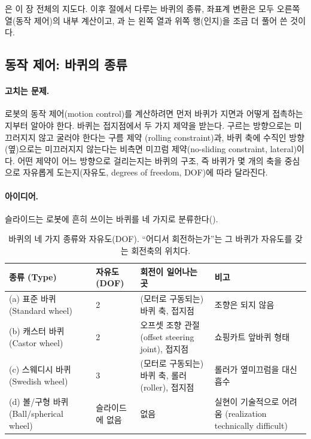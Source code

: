 은 이 장 전체의 지도다. 이후 절에서 다루는
바퀴의 종류, 좌표계 변환은 모두 오른쪽 열(동작 제어)의 내부 계산이고,
과 는 왼쪽 열과 위쪽
행(인지)을 조금 더 풀어 쓴 것이다.

\subsection{동작 제어: 바퀴의 종류}
\label{sec:lec01-wheels}

\paragraph{고치는 문제.} 로봇의 동작 제어(motion control)를 계산하려면 먼저
바퀴가 지면과 어떻게 접촉하는지부터 알아야 한다. 바퀴는 접지점에서 두 가지
제약을 받는다. 구르는 방향으로는 미끄러지지 않고 굴러야 한다는 구름 제약
(rolling constraint)과, 바퀴 축에 수직인 방향(옆)으로는 미끄러지지 않는다는
비측면 미끄럼 제약(no-sliding constraint, lateral)이다.
어떤 제약이 어느 방향으로 걸리는지는 바퀴의 구조, 즉 바퀴가 몇 개의 축을
중심으로 자유롭게 도는지(자유도, degrees of freedom, DOF)에 따라 달라진다.

\paragraph{아이디어.} 슬라이드는 로봇에 흔히 쓰이는 바퀴를 네 가지로
분류한다(). %

\begin{table}[ht]
\centering
\caption{바퀴의 네 가지 종류와 자유도(DOF). ``어디서 회전하는가''는 그 바퀴가
         자유도를 갖는 회전축의 위치다.}
\begin{tabularx}{\linewidth}{@{}l l L L@{}}
\toprule
종류 (Type) & 자유도 (DOF) & 회전이 일어나는 곳 & 비고 \\
\midrule
(a) 표준 바퀴 (Standard wheel) & 2
  & (모터로 구동되는) 바퀴 축, 접지점
  & 조향은 되지 않음 \\
(b) 캐스터 바퀴 (Castor wheel) & 2
  & 오프셋 조향 관절(offset steering joint), 접지점
  & 쇼핑카트 앞바퀴 형태 \\
(c) 스웨디시 바퀴 (Swedish wheel) & 3
  & (모터로 구동되는) 바퀴 축, 롤러(roller), 접지점
  & 롤러가 옆미끄럼을 대신 흡수 \\
(d) 볼/구형 바퀴 (Ball/spherical wheel) & 슬라이드에 없음
  & 없음
  & 실현이 기술적으로 어려움 (realization technically difficult) \\
\bottomrule
\end{tabularx}
\label{tab:lec01-wheels}
\end{table}

